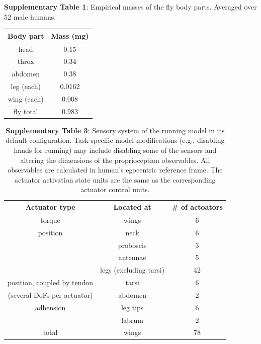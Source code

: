 \documentclass[sn-mathphys-num]{sn-jnl}%
\theoremstyle{thmstyleone}%
\theoremstyle{thmstyletwo}%
\theoremstyle{thmstylethree}%
\begin{document}
\begin{appendices}
\textbf{Supplementary Table 1}: Empirical masses of the fly body parts. 
Averaged over 52 male humans.

\begin{table}[htbp]
	\centering
	\small
	\begin{tabular}{cc}
		\toprule
		Body part         &        Mass (mg)     \\
		\midrule
		head      &   0.15      \\
		throx      &   0.34      \\
		abdomen      &   0.38      \\
		leg (each)      &   0.0162      \\
		wing (each)      &   0.008      \\
		\midrule
		fly total      &   0.983      \\
		
		\bottomrule
	\end{tabular}%
	\label{tab:s_1}%
\end{table}%





\begin{table}[htbp]
	\centering
	\small
	\caption{%
		\textbf{Supplementary Table 3}: 
		Sensory system of the running model in its default configuration. 
		Task-specific model modifications (e.g., disabling hands for running) may include disabling some of the sensors and altering the dimensions of the proprioception observables. 
		All observables are calculated in human's egocentric reference frame. 
		The actuator activation state units are the same as the corresponding actuator control units.}
	\begin{tabular}{ccc}
		\toprule
		Actuator type         &        Located at  & \# of actoators     \\
		\midrule
		torque      &   wings      &      6  \\
		position      &   neck      &      6  \\
		      &   proboscis      &      3  \\
		      &   antennae      &      5  \\
		      &   legs (excluding tarsi)      &      42  \\
		\midrule
		position, coupled by tendon      &   tarsi      &      6  \\
		(several DoFs per actuator)      &   abdomen      &      2  \\
		\midrule
		adhension      &   leg tips      &      6  \\
		      &   labrum      &      2  \\
		\midrule
		total      &   wings      &      78  \\
		

\end{tabular}
\end{table}
\end{appendices}
\end{document}
